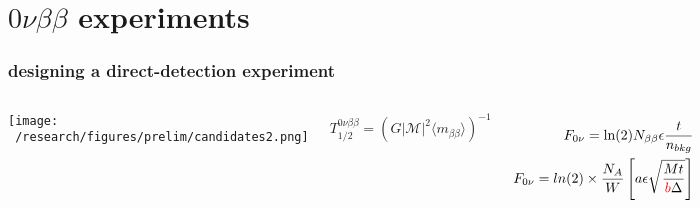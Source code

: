 \documentclass{beamer}
\begin{document}
\section{$0\nu\beta\beta$ experiments}
	
	\begin{frame}
		\frametitle{designing a direct-detection experiment}
		\begin{columns}[c] %
			
			\hspace*{-0.5cm}\texttt{[image: ~/research/figures/prelim/candidates2.png]}
			
			\begin{equation*}
			T_{1/2}^{0\nu\beta\beta} = \left( G|\mathcal{M}|^2 \langle m_{\beta\beta}\rangle \right) ^{-1}
			\end{equation*}
			
%			
			\begin{eqnarray*}
			F_{0\nu} =  \text{ln}(2)N_{\beta\beta}\epsilon \frac{t}{n_{bkg}} \\
			F_{0\nu} = ln(2) \times \frac{N_A}{W} \left[ a\epsilon \sqrt{\frac{Mt}{\textcolor{red}{b}\Delta}}\right]
			\end{eqnarray*}
		\end{columns}
	\end{frame}
	
\end{document}

